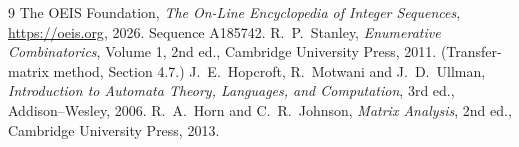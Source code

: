 \documentclass[11pt,a4paper]{article}
\theoremstyle{plain}
\theoremstyle{definition}
\begin{document}
\begin{thebibliography}{9}
 The OEIS Foundation, \emph{The On-Line Encyclopedia of Integer
Sequences}, \url{https://oeis.org}, 2026. Sequence A185742.
 R.~P.~Stanley, \emph{Enumerative Combinatorics}, Volume 1, 2nd ed.,
Cambridge University Press, 2011. (Transfer-matrix method, Section 4.7.)
 J.~E.~Hopcroft, R.~Motwani and J.~D.~Ullman, \emph{Introduction to Automata
Theory, Languages, and Computation}, 3rd ed., Addison--Wesley, 2006.
 R.~A.~Horn and C.~R.~Johnson, \emph{Matrix Analysis}, 2nd ed., Cambridge
University Press, 2013.
\end{thebibliography}
\end{document}
